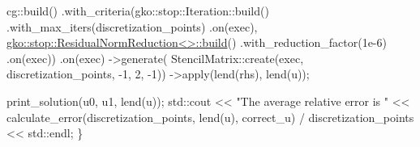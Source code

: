\begin{DoxyCodeInclude}
    cg::build()
        .with\_criteria(gko::stop::Iteration::build()
                           .with\_max\_iters(discretization\_points)
                           .on(exec),
                       \hyperlink{classgko_1_1stop_1_1ResidualNormReduction}{gko::stop::ResidualNormReduction<>::build}()
                           .with\_reduction\_factor(1e-6)
                           .on(exec))
        .on(exec)
        ->generate(
            StencilMatrix::create(exec, discretization\_points, -1, 2, -1))
        ->apply(lend(rhs), lend(u));

    print\_solution(u0, u1, lend(u));
    std::cout << \textcolor{stringliteral}{"The average relative error is "}
              << calculate\_error(discretization\_points, lend(u), correct\_u) /
                     discretization\_points
              << std::endl;
\}
\end{DoxyCodeInclude}
 